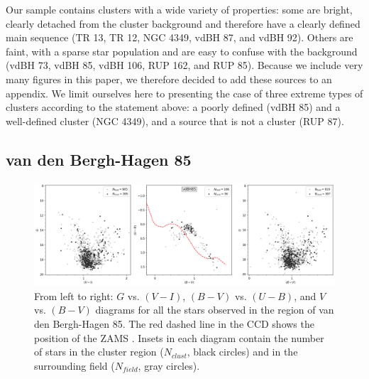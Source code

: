 \documentclass[draft]{aa}
\begin{document}
Our sample contains clusters with a wide variety of properties: some are
bright, clearly detached from the cluster background and therefore have a
clearly defined main sequence (TR 13, TR 12, NGC 4349, vdBH 87, and vdBH 92).
Others are faint, with a sparse star population and are easy to
confuse with the background (vdBH 73, vdBH 85, vdBH 106, RUP 162, and RUP 85).
Because we include very many figures in this paper, we therefore decided to
add these sources to an appendix. We limit ourselves here to presenting
the case of three extreme types of clusters according to the statement
above: a poorly defined (vdBH 85) and a well-defined cluster (NGC 4349), and a
source that is not a cluster (RUP 87).






\subsection{van den Bergh-Hagen 85}
\label{ssec:vdbh85}

\begin{figure}[ht]
    \centering
    \includegraphics[width=\hsize]{../figs/obs_vdBH85.png}
\caption{From left to right: $G$ vs. $(V-I)$, $(B-V)$ vs. $(U-B)$, and
$V$ vs. $(B-V)$ diagrams for all the stars observed in the region of van
den Bergh-Hagen 85.
The red dashed line in the CCD shows the position of the ZAMS
\citep{Aller1982}. Insets in each diagram contain the number of stars 
in the cluster region ($N_{clust}$, black circles) and in the surrounding
field ($N_{field}$, gray circles).
}
    \label{fig:photom_vdBH85} %
\end{figure}
\end{document}
